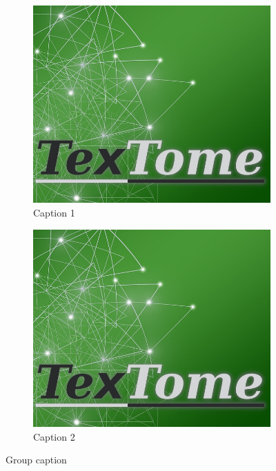 \begin{figure}[H]
     \centering
     \begin{subfigure}[b]{0.4\textwidth}
         \centering
         \includegraphics[width=\textwidth]{Figures/general/dummy_sq.jpg}
         \caption{Caption 1}
         \label{fig:pic1}
     \end{subfigure}
     \hfill
     \begin{subfigure}[b]{0.4\textwidth}
         \centering
         \includegraphics[width=\textwidth]{Figures/general/dummy_sq.jpg}
         \caption{Caption 2}
         \label{fig:pic2}
     \end{subfigure}
     \caption{Group caption}
     \label{fig:groupPic}
\end{figure}

